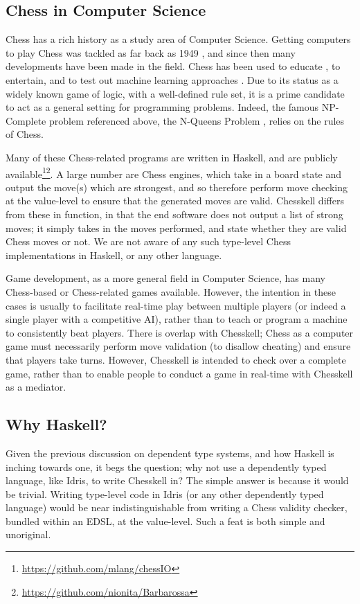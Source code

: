 \subsection{Chess in Computer Science}

Chess has a rich history as a study area of Computer Science. Getting computers to play Chess was tackled as far back as 1949 \cite{1949chess}, and since then many developments have been made in the field. Chess has been used to educate \cite{chesseducation}, to entertain, and to test out machine learning approaches \cite{chessml}. Due to its status as a widely known game of logic, with a well-defined rule set, it is a prime candidate to act as a general setting for programming problems. Indeed, the famous NP-Complete problem referenced above, the N-Queens Problem \cite{nqueensnp}, relies on the rules of Chess.

Many of these Chess-related programs are written in Haskell, and are publicly available\footnote{\url{https://github.com/mlang/chessIO}}\footnote{\url{https://github.com/nionita/Barbarossa}}. A large number are Chess engines, which take in a board state and output the move(s) which are strongest, and so therefore perform move checking at the value-level to ensure that the generated moves are valid. Chesskell differs from these in function, in that the end software does not output a list of strong moves; it simply takes in the moves performed, and state whether they are valid Chess moves or not. We are not aware of any such type-level Chess implementations in Haskell, or any other language.

Game development, as a more general field in Computer Science, has many Chess-based or Chess-related games available. However, the intention in these cases is usually to facilitate real-time play between multiple players (or indeed a single player with a competitive AI), rather than to teach or program a machine to consistently beat players. There is overlap with Chesskell; Chess as a computer game must necessarily perform move validation (to disallow cheating) and ensure that players take turns. However, Chesskell is intended to check over a complete game, rather than to enable people to conduct a game in real-time with Chesskell as a mediator.

\subsection{Why Haskell?}

Given the previous discussion on dependent type systems, and how Haskell is inching towards one, it begs the question; why not use a dependently typed language, like Idris, to write Chesskell in? The simple answer is because it would be trivial. Writing type-level code in Idris (or any other dependently typed language) would be near indistinguishable from writing a Chess validity checker, bundled within an EDSL, at the value-level. Such a feat is both simple and unoriginal.

